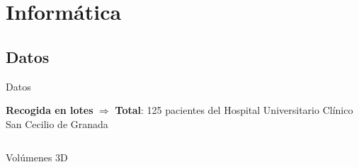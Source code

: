 \documentclass{beamer}
\begin{document}
\section{Informática}

\subsection{Datos}
\begin{frame}{Datos}
\begin{block}{}
\centering
\textbf{Recogida en lotes} $\Longrightarrow$ \textbf{Total}: 125 pacientes del Hospital Universitario Clínico San Cecilio de Granada \\
\end{block}


\begin{columns}[T]

    \begin{block}{Volúmenes 3D}
    \end{block}


\end{columns}
\end{frame}
\end{document}

